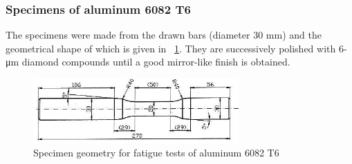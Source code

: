 \documentclass[3p,times,number,review]{elsarticle}
\newcommand{\figref}[1]{\figurename~\ref{#1}}
\begin{document}
\subsubsection{Specimens of aluminum 6082 T6}
The specimens were made from the drawn bars (diameter 30 mm) and the geometrical shape of which is given in \figref{fig:aluminum6082T6}. They are successively polished with 6-μm diamond compounds until a good mirror-like finish is obtained.
\begin{figure}[!h]
\centering
\includegraphics[width=0.7\textwidth]{figures//aluminum6082T6sample.png} 
\caption{Specimen geometry for fatigue tests of aluminum 6082 T6}
\label{fig:aluminum6082T6}
\end{figure}
\end{document}
